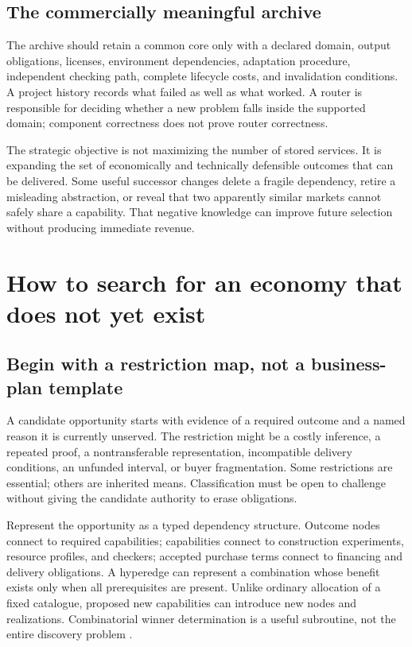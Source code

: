 \documentclass[11pt,letterpaper]{article}
\theoremstyle{remark}\newtheorem{remark}{Remark}[section]
\begin{document}
\subsection{The commercially meaningful archive}
The archive should retain a common core only with a declared domain, output obligations, licenses, environment dependencies, adaptation procedure, independent checking path, complete lifecycle costs, and invalidation conditions. A project history records what failed as well as what worked. A router is responsible for deciding whether a new problem falls inside the supported domain; component correctness does not prove router correctness.

The strategic objective is not maximizing the number of stored services. It is expanding the set of economically and technically defensible outcomes that can be delivered. Some useful successor changes delete a fragile dependency, retire a misleading abstraction, or reveal that two apparently similar markets cannot safely share a capability. That negative knowledge can improve future selection without producing immediate revenue.

\section{How to search for an economy that does not yet exist}
\label{sec:architecture}
\subsection{Begin with a restriction map, not a business-plan template}
A candidate opportunity starts with evidence of a required outcome and a named reason it is currently unserved. The restriction might be a costly inference, a repeated proof, a nontransferable representation, incompatible delivery conditions, an unfunded interval, or buyer fragmentation. Some restrictions are essential; others are inherited means. Classification must be open to challenge without giving the candidate authority to erase obligations.

Represent the opportunity as a typed dependency structure. Outcome nodes connect to required capabilities; capabilities connect to construction experiments, resource profiles, and checkers; accepted purchase terms connect to financing and delivery obligations. A hyperedge can represent a combination whose benefit exists only when all prerequisites are present. Unlike ordinary allocation of a fixed catalogue, proposed new capabilities can introduce new nodes and realizations. Combinatorial winner determination is a useful subroutine, not the entire discovery problem \citep{sandholm2002}.
\end{document}

